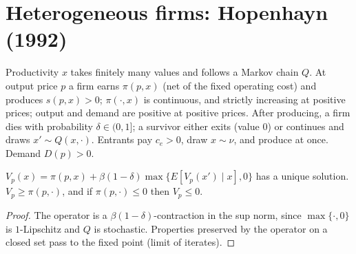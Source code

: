 \section{Heterogeneous firms: Hopenhayn (1992)}
\label{sec:hopenhayn}

\begin{definition}
\label{def:hop_model}
\leanok
Productivity $x$ takes finitely many values and follows a Markov chain $Q$. At output price $p$ a firm earns
$\pi(p,x)$ (net of the fixed operating cost) and produces $s(p,x)>0$; $\pi(\cdot,x)$ is continuous, and strictly
increasing at positive prices; output and demand are positive at positive prices. After producing, a firm dies with probability $\delta\in(0,1]$; a survivor either exits (value $0$) or
continues and draws $x'\sim Q(x,\cdot)$. Entrants pay $c_e>0$, draw $x\sim\nu$, and produce at once. Demand $D(p)>0$.
\end{definition}

\begin{lemma}
\label{lem:hop_value}
\leanok
{}
$V_p(x)=\pi(p,x)+\beta(1-\delta)\max\{E[V_p(x')\mid x],0\}$ has a unique solution. $V_p\ge\pi(p,\cdot)$, and if
$\pi(p,\cdot)\le0$ then $V_p\le0$.
\end{lemma}
\begin{proof}
\leanok
The operator is a $\beta(1-\delta)$-contraction in the sup norm, since $\max\{\cdot,0\}$ is $1$-Lipschitz and $Q$ is
stochastic. Properties preserved by the operator on a closed set pass to the fixed point (limit of iterates).
\end{proof}

